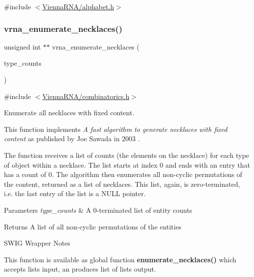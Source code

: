 {\ttfamily \#include $<$\mbox{\hyperlink{alphabet_8h}{Vienna\+R\+N\+A/alphabet.\+h}}$>$}

\mbox{\label{group__utils_gae081ac655a76bd5c4b3d86c60b096b75}} 
\subsubsection{\texorpdfstring{vrna\+\_\+enumerate\+\_\+necklaces()}{vrna\_enumerate\_necklaces()}}
{\footnotesize\ttfamily unsigned int $\ast$$\ast$ vrna\+\_\+enumerate\+\_\+necklaces (\begin{DoxyParamCaption}\item[{const unsigned int $\ast$}]{type\+\_\+counts }\end{DoxyParamCaption})}



{\ttfamily \#include $<$\mbox{\hyperlink{combinatorics_8h}{Vienna\+R\+N\+A/combinatorics.\+h}}$>$}



Enumerate all necklaces with fixed content. 

This function implements {\itshape A fast algorithm to generate necklaces with fixed content} as published by Joe Sawada in 2003 \cite{sawada:2003}.

The function receives a list of counts (the elements on the necklace) for each type of object within a necklace. The list starts at index 0 and ends with an entry that has a count of 0. The algorithm then enumerates all non-\/cyclic permutations of the content, returned as a list of necklaces. This list, again, is zero-\/terminated, i.\+e. the last entry of the list is a {\ttfamily N\+U\+LL} pointer.


\begin{DoxyParams}{Parameters}
{\em type\+\_\+counts} & A 0-\/terminated list of entity counts \\
\hline
\end{DoxyParams}
\begin{DoxyReturn}{Returns}
A list of all non-\/cyclic permutations of the entities
\end{DoxyReturn}
\begin{DoxyRefDesc}{S\+W\+I\+G Wrapper Notes}
\item[\mbox{\hyperlink{wrappers__wrappers000003}{S\+W\+I\+G Wrapper Notes}}]This function is available as global function {\bfseries enumerate\+\_\+necklaces()} which accepts lists input, an produces list of lists output. \end{DoxyRefDesc}
\mbox{\label{group__utils_gaf37a0979367c977edfb9da6614eebe99}} 
